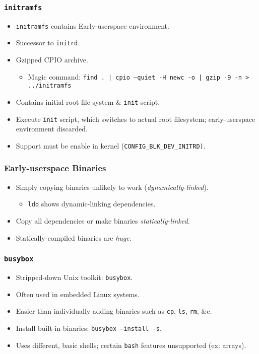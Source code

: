 \documentclass[xcolor={dvipsnames,svgnames},hyperref=dvips]{beamer}
\begin{document}
	\begin{frame}
		\frametitle{\texttt{initramfs}}
		\begin{itemize}
		\item \texttt{initramfs} contains Early-userspace environment.
		\item Successor to \texttt{initrd}.
		\item Gzipped CPIO archive.
			\begin{itemize}
			\item Magic command: \texttt{find . | cpio --quiet -H newc -o | gzip -9 -n > ../initramfs}
			\end{itemize}
		\item Contains initial root file system \& \texttt{init} script.
		\item Execute \texttt{init} script, which switches to actual root filesystem; early-userspace environment discarded.
		\item Support must be enable in kernel (\texttt{CONFIG\_BLK\_DEV\_INITRD)}.
		\end{itemize}
	\end{frame}

	\begin{frame}
		\frametitle{Early-userspace Binaries}
		\begin{itemize}
		\item Simply copying binaries unlikely to work (\textit{dynamically-linked}).
			\begin{itemize}
			\item \texttt{ldd} shows dynamic-linking dependencies.
			\end{itemize}
		\item Copy all dependencies or make binaries \textit{statically-linked}.
		\item Statically-compiled binaries are \textit{huge}.
		\end{itemize}
	\end{frame}

	\begin{frame}
		\frametitle{\texttt{busybox}}
		\begin{itemize}
		\item Stripped-down Unix toolkit: \texttt{busybox}.
		\item Often used in embedded Linux systems.
		\item Easier than individually adding binaries such as \texttt{cp}, \texttt{ls}, \texttt{rm}, \&c.
		\item Install built-in binaries: \texttt{busybox --install -s}.
		\item Uses different, basic shells; certain \texttt{bash} features unsupported (ex: arrays).
		\end{itemize}
	\end{frame}
\end{document}
